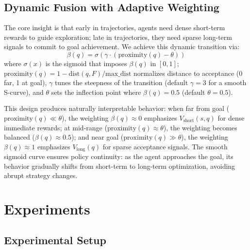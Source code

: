 \documentclass{article}
\begin{document}
\subsection{Dynamic Fusion with Adaptive Weighting}

The core insight is that early in trajectories, agents need dense short-term rewards to guide exploration; late in trajectories, they need sparse long-term signals to commit to goal achievement. We achieve this dynamic transition via:
\begin{equation}
\beta(q) = \sigma(\gamma \cdot (\text{proximity}(q) - \theta))
\label{eq:beta_definition}
\end{equation}
where $\sigma(x)$ is the sigmoid that imposes $\beta(q)$ in $[0,1]$; $\text{proximity}(q) = 1 - {\text{dist}(q, F)}/{\text{max\_dist}}$ normalizes distance to acceptance (0 far, 1 at goal), $\gamma$ tunes the steepness of the transition (default $\gamma = 3$ for a smooth S-curve), and $\theta$ sets the inflection point where $\beta(q) = 0.5$ (default $\theta = 0.5$).

This design produces naturally interpretable behavior: when far from goal ($\text{proximity}(q) \ll \theta$), the weighting $\beta(q) \approx 0$ emphasizes $V_{\text{short}}(s,q)$ for dense immediate rewards; at mid-range ($\text{proximity}(q) \approx \theta$), the weighting becomes balanced ($\beta(q) \approx 0.5$); and near goal ($\text{proximity}(q) \gg \theta$), the weighting $\beta(q) \approx 1$ emphasizes $V_{\text{long}}(q)$ for sparse acceptance signals. The smooth sigmoid curve ensures policy continuity: as the agent approaches the goal, its behavior gradually shifts from short-term to long-term optimization, avoiding abrupt strategy changes.




\section{Experiments}
\label{sec:experiments}

\subsection{Experimental Setup}
\end{document}
